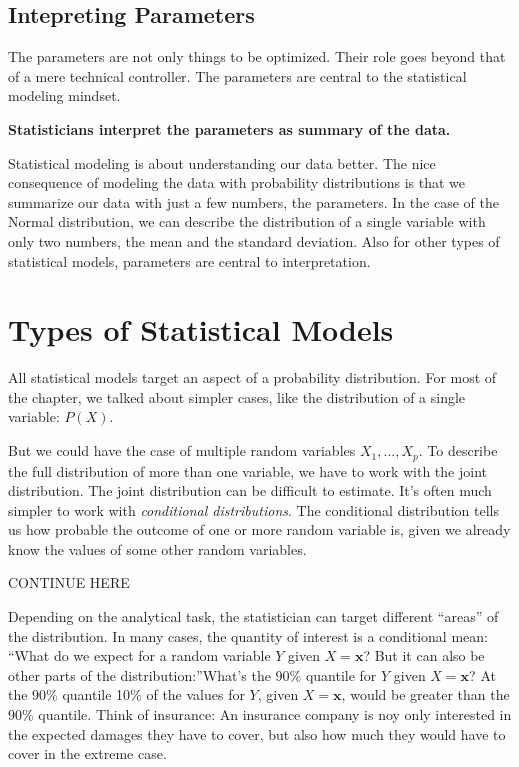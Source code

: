 \documentclass[
  10pt,
]{scrbook}
\begin{document}
\hypertarget{intepreting-parameters}{%
\subsection*{Intepreting Parameters}\label{intepreting-parameters}}


The parameters are not only things to be optimized.
Their role goes beyond that of a mere technical controller.
The parameters are central to the statistical modeling mindset.

\textbf{Statisticians interpret the parameters as summary of the data.}

Statistical modeling is about understanding our data better.
The nice consequence of modeling the data with probability distributions is that we summarize our data with just a few numbers, the parameters.
In the case of the Normal distribution, we can describe the distribution of a single variable with only two numbers, the mean and the standard deviation.
Also for other types of statistical models, parameters are central to interpretation.

\hypertarget{types-of-statistical-models}{%
\section{Types of Statistical Models}\label{types-of-statistical-models}}

All statistical models target an aspect of a probability distribution.
For most of the chapter, we talked about simpler cases, like the distribution of a single variable: \(P(X)\).

But we could have the case of multiple random variables \(X_1, \ldots, X_p\).
To describe the full distribution of more than one variable, we have to work with the joint distribution.
The joint distribution can be difficult to estimate.
It's often much simpler to work with \emph{conditional distributions}.
The conditional distribution tells us how probable the outcome of one or more random variable is, given we already know the values of some other random variables.

CONTINUE HERE

Depending on the analytical task, the statistician can target different ``areas'' of the distribution.
In many cases, the quantity of interest is a conditional mean: ``What do we expect for a random variable \(Y\) given \(X= \mathbf{x}\)?
But it can also be other parts of the distribution:''What's the 90\% quantile for \(Y\) given \(X = \mathbf{x}\)?
At the 90\% quantile 10\% of the values for \(Y\), given \(X=\mathbf{x}\), would be greater than the 90\% quantile.
Think of insurance: An insurance company is noy only interested in the expected damages they have to cover, but also how much they would have to cover in the extreme case.
\end{document}
